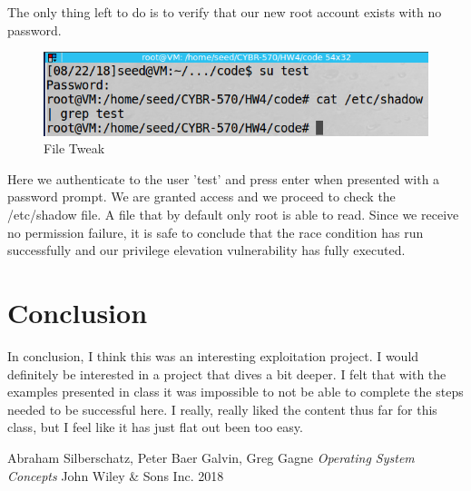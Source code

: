 \documentclass[10pt]{article}
\begin{document}
The only thing left to do is to verify that our new root account exists with no password.

\begin{figure}[H]
\centering
\includegraphics[scale=0.5]{./images/ss06.png}
\caption{File Tweak}
\label{fig:Code}
\end{figure}

Here we authenticate to the user 'test' and press enter when presented with a password prompt.  We are granted access and we proceed to check the /etc/shadow file.  A file that by default only root is able to read.  Since we receive no permission failure, it is safe to conclude that the race condition has run successfully and our privilege elevation vulnerability has fully executed.

\section{Conclusion}
In conclusion, I think this was an interesting exploitation project.  I would definitely be interested in a project that dives a bit deeper.  I felt that with the examples presented in class it was impossible to not be able to complete the steps needed to be successful here.  I really, really liked the content thus far for this class, but I feel like it has just flat out been too easy.

\pagebreak
\begin{thebibliography}{9}
Abraham Silberschatz, Peter Baer Galvin, Greg Gagne
\textit{Operating System Concepts}
John Wiley \& Sons Inc. 2018
\end{thebibliography}
\end{document}
